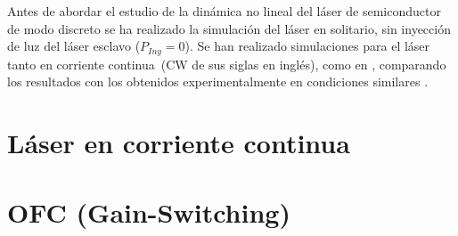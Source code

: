 \graphicspath{{../Graphics/Cpt1-Charactz/}}

\newcommand{\cw}{corriente continua}

Antes de abordar el estudio de la dinámica no lineal del láser de semiconductor de modo discreto se ha realizado la simulación del láser en solitario, sin inyección de luz del láser esclavo ($P_{Iny} = 0$). Se han realizado simulaciones para el láser tanto en \cw\ (CW de sus siglas en inglés), como en \gs, comparando los resultados con los obtenidos experimentalmente en condiciones similares \cite{Chaves19}.

	\section{Láser en \cw}
		\label{Sol:CW}
		
		

	\section{OFC (Gain-Switching)}
		\label{Sol:OFC}

		


